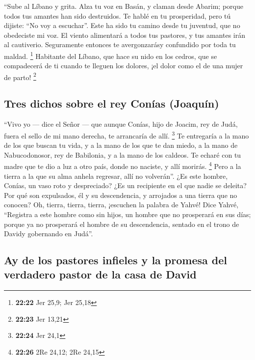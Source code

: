  ``Sube al Líbano y grita. Alza tu voz en Basán, y claman
desde Abarim; porque todos tus amantes han sido destruidos.
 Te hablé en tu prosperidad, pero tú dijiste: ``No voy a
escuchar''. Este ha sido tu camino desde tu juventud, que no obedeciste
mi voz.  El viento alimentará a todos tus pastores, y tus
amantes irán al cautiverio. Seguramente entonces te avergonzarásy
confundido por toda tu maldad. \footnote{\textbf{22:22} Jer 25,9; Jer
  25,18}  Habitante del Líbano, que hace su nido en los
cedros, que se compadecerá de ti cuando te lleguen los dolores, ¡el
dolor como el de una mujer de parto! \footnote{\textbf{22:23} Jer 13,21}

\hypertarget{tres-dichos-sobre-el-rey-conuxedas-joaquuxedn}{%
\subsection{Tres dichos sobre el rey Conías
(Joaquín)}\label{tres-dichos-sobre-el-rey-conuxedas-joaquuxedn}}

 ``Vivo yo --- dice el Señor --- que aunque Conías, hijo
de Joacim, rey de Judá, fuera el sello de mi mano derecha, te arrancaría
de allí. \footnote{\textbf{22:24} Jer 24,1}  Te
entregaría a la mano de los que buscan tu vida, y a la mano de los que
te dan miedo, a la mano de Nabucodonosor, rey de Babilonia, y a la mano
de los caldeos.  Te echaré con tu madre que te dio a luz
a otro país, donde no naciste, y allí morirás. \footnote{\textbf{22:26}
  2Re 24,12; 2Re 24,15}  Pero a la tierra a la que su
alma anhela regresar, allí no volverán''.  ¿Es este
hombre, Conías, un vaso roto y despreciado? ¿Es un recipiente en el que
nadie se deleita? Por qué son expulsados, él y su descendencia, y
arrojados a una tierra que no conocen?  Oh, tierra,
tierra, tierra, ¡escuchen la palabra de Yahvé!  Dice
Yahvé, ``Registra a este hombre como sin hijos, un hombre que no
prosperará en sus días; porque ya no prosperará el hombre de su
descendencia, sentado en el trono de Davidy gobernando en Judá''.

\hypertarget{ay-de-los-pastores-infieles-y-la-promesa-del-verdadero-pastor-de-la-casa-de-david}{%
\subsection{Ay de los pastores infieles y la promesa del verdadero
pastor de la casa de
David}\label{ay-de-los-pastores-infieles-y-la-promesa-del-verdadero-pastor-de-la-casa-de-david}}

